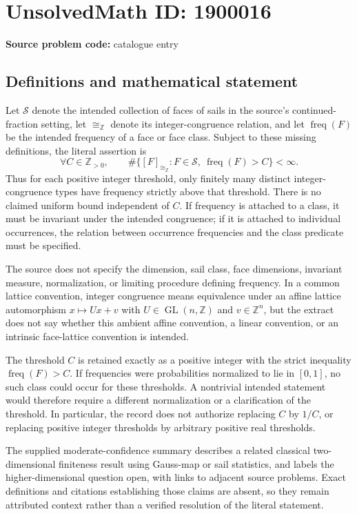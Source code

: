 \documentclass[11pt]{article}
\newcommand{\Z}{\mathbb{Z}}
\begin{document}
\section*{UnsolvedMath ID: 1900016}
\textbf{Source problem code:} catalogue entry
\subsection{Definitions and mathematical statement}
Let $\mathcal S$ denote the intended collection of faces of sails in the source's continued-fraction setting, let $\cong_{\Z}$ denote its integer-congruence relation, and let $\operatorname{freq}(F)$ be the intended frequency of a face or face class. Subject to these missing definitions, the literal assertion is
\[
\forall C\in\Z_{>0},\qquad
\#\{[F]_{\cong_{\Z}}:F\in\mathcal S,\ \operatorname{freq}(F)>C\}<\infty.
\]
Thus for each positive integer threshold, only finitely many distinct integer-congruence types have frequency strictly above that threshold. There is no claimed uniform bound independent of $C$. If frequency is attached to a class, it must be invariant under the intended congruence; if it is attached to individual occurrences, the relation between occurrence frequencies and the class predicate must be specified.

The source does not specify the dimension, sail class, face dimensions, invariant measure, normalization, or limiting procedure defining frequency. In a common lattice convention, integer congruence means equivalence under an affine lattice automorphism $x\mapsto Ux+v$ with $U\in\operatorname{GL}(n,\Z)$ and $v\in\Z^n$, but the extract does not say whether this ambient affine convention, a linear convention, or an intrinsic face-lattice convention is intended.

The threshold $C$ is retained exactly as a positive integer with the strict inequality $\operatorname{freq}(F)>C$. If frequencies were probabilities normalized to lie in $[0,1]$, no such class could occur for these thresholds. A nontrivial intended statement would therefore require a different normalization or a clarification of the threshold. In particular, the record does not authorize replacing $C$ by $1/C$, or replacing positive integer thresholds by arbitrary positive real thresholds.

The supplied moderate-confidence summary describes a related classical two-dimensional finiteness result using Gauss-map or sail statistics, and labels the higher-dimensional question open, with links to adjacent source problems. Exact definitions and citations establishing those claims are absent, so they remain attributed context rather than a verified resolution of the literal statement.
\end{document}

